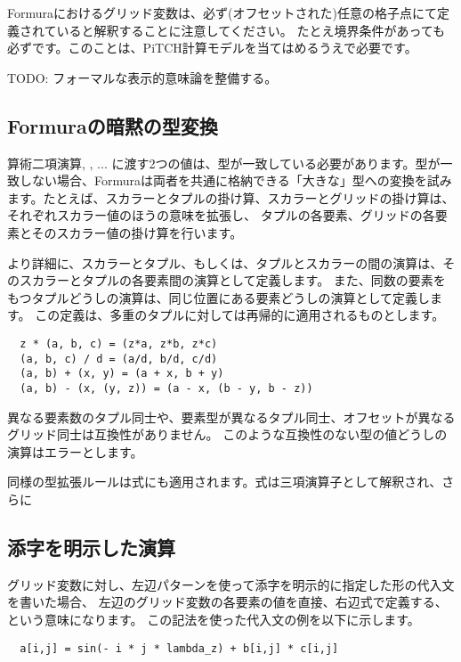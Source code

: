 \documentclass{jsarticle}
\begin{document}
Formuraにおけるグリッド変数は、必ず(オフセットされた)任意の格子点にて定義されていると解釈することに注意してください。
たとえ境界条件があっても必ずです。このことは、PiTCH計算モデルを当てはめるうえで必要です。

TODO: フォーマルな表示的意味論を整備する。


\subsection{Formuraの暗黙の型変換}

算術二項演算\lit{+}, \lit{*}, ... に渡す2つの値は、型が一致している必要があります。型が一致しない場合、Formuraは両者を共通に格納できる「大きな」型への変換を試みます。たとえば、スカラーとタプルの掛け算、スカラーとグリッドの掛け算は、それぞれスカラー値のほうの意味を拡張し、
タプルの各要素、グリッドの各要素とそのスカラー値の掛け算を行います。

より詳細に、スカラーとタプル、もしくは、タプルとスカラーの間の演算は、そのスカラーとタプルの各要素間の演算として定義します。
また、同数の要素をもつタプルどうしの演算は、同じ位置にある要素どうしの演算として定義します。
この定義は、多重のタプルに対しては再帰的に適用されるものとします。

\begin{lstlisting}
  z * (a, b, c) = (z*a, z*b, z*c)
  (a, b, c) / d = (a/d, b/d, c/d)
  (a, b) + (x, y) = (a + x, b + y)
  (a, b) - (x, (y, z)) = (a - x, (b - y, b - z))
\end{lstlisting}

異なる要素数のタプル同士や、要素型が異なるタプル同士、オフセットが異なるグリッド同士は互換性がありません。
このような互換性のない型の値どうしの演算はエラーとします。

同様の型拡張ルールは式にも適用されます。式は三項演算子として解釈され、さらに

\subsection{添字を明示した演算}


グリッド変数に対し、左辺パターンを使って添字を明示的に指定した形の代入文を書いた場合、
左辺のグリッド変数の各要素の値を直接、右辺式で定義する、という意味になります。
この記法を使った代入文の例を以下に示します。

\begin{lstlisting}
  a[i,j] = sin(- i * j * lambda_z) + b[i,j] * c[i,j]
\end{lstlisting}
\end{document}
